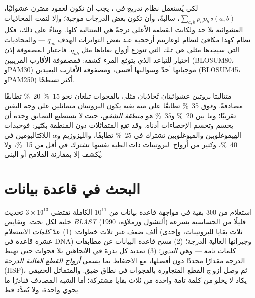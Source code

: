 \begin{proposition}\label{prop:b3:bioinformatics:logodds}
لكي يُستعمل نظام تدريج في ، يجب أن تكون  لعمود مقترن عشوائيًا، $\sum_{a,b} p_{a} p_{b}\, s(a,b)$،
سالبةً، وأن تكون بعض الدرجات موجبة؛ وإلا لنمت المحاذيات
العشوائية بلا حد ولكانت القطعة الأعلى درجةً
هي المتتالية كلها. وبناءً على ذلك، فكل نظام كهذا
مكافئ لنظام لوغاريتم أرجحية عند \emph{بعض} التواترات الهدف
$q_{ab}$ --- والمحاذيات التي سيجدها مثلى هي تلك التي تتوزع
أزواج بقاياها مثل $q_{ab}$. فاختيار المصفوفة إذن
اختيار للتباعد الذي يتوقع المرء كشفه: فمصفوفة الأقارب
القريبين (BLOSUM80، وPAM30) موجباتها أحدّ وسوالبها أقسى،
ومصفوفة الأقارب البعيدين (BLOSUM45، وPAM250) أكثر تسطحًا.
\end{proposition}
\admitted

\begin{example}\label{ex:b3:bioinformatics:twilight}
متتاليتا بروتين عشوائيتان تُحاذيان  مثلى بالفجوات تبلغان نحو
\qtyrange{15}{20}{\%} تطابقًا مصادفةً. وفوق \qty{35}{\%} تطابقًا
على مئة بقية يكون البروتينان متماثلين على وجه اليقين تقريبًا؛
وما بين \qty{20}{\%} و\qty{35}{\%} هو \emph{منطقة الشفق}،
حيث لا يستطيع التطابق وحده أن يحسم وتحسم الإحصاءات أدناه.
وقد تقع المتماثلات دون المنطقة بكثير: فوحيدات الهيموغلوبين والميوغلوبين
تشترك في \qty{25}{\%} تطابقًا، والليزوزيم و$\alpha$-اللاكتالبومين
في \qty{40}{\%}، وكثير من أزواج البروتينات ذات الطية نفسها تشترك في أقل
من \qty{15}{\%}، ولا يُكشف إلا بمقارنة الملامح أو البنى.
\end{example}

\section{البحث في قاعدة بيانات}

\begin{definition}[BLAST]\label{def:b3:bioinformatics:blast}
 استعلام من \num{300} بقية في مواجهة قاعدة بيانات من $10^{11}$
 الكاملة تقتضي $3\times 10^{13}$ تحديث خلية
لكل بحث. وتقايض \emph{BLAST} (ألتشول وزملاؤه، 1990) قليلًا من
الحساسية بسرعة ألف ضعف عبر ثلاث خطوات: (1) عدّ \emph{كلمات}
الاستعلام (ثلاث بقايا للبروتينات، وإحدى عشرة قاعدة
في DNA) وجيرانها العالية الدرجة؛ (2) مسح قاعدة البيانات عن
مطابقات كلمات تامة --- وهي \emph{البذور}؛ (3) تمديد كل بذرة في
الاتجاهين بلا فجوات حتى تهبط الدرجة مقدارًا محددًا دون
أفضلها، مع الاحتفاظ بما يسمى \emph{أزواج القطع العالية الدرجة} (HSP)، ثم وصل
أزواج القطع المتجاورة  بالفجوات في نطاق ضيق. والمتماثل
الحقيقي يكاد لا يخلو من كلمة تامة واحدة من ثلاث بقايا
مشتركة؛ أما الشبه المصادف فنادرًا ما يحوي واحدة، ولا يُمدَّد قط.
\end{definition}

